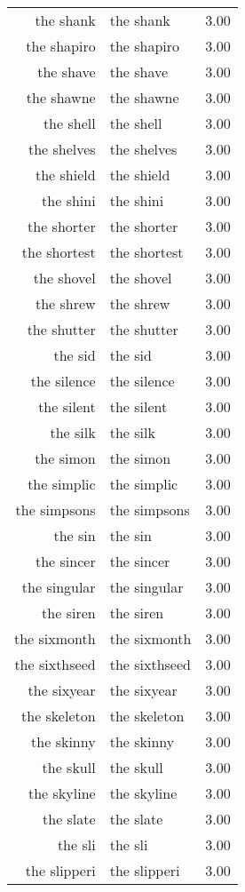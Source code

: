 \begin{table}[ht]
\begin{tabular}{rlr}
  the shank & the shank & 3.00 \\ 
  the shapiro & the shapiro & 3.00 \\ 
  the shave & the shave & 3.00 \\ 
  the shawne & the shawne & 3.00 \\ 
  the shell & the shell & 3.00 \\ 
  the shelves & the shelves & 3.00 \\ 
  the shield & the shield & 3.00 \\ 
  the shini & the shini & 3.00 \\ 
  the shorter & the shorter & 3.00 \\ 
  the shortest & the shortest & 3.00 \\ 
  the shovel & the shovel & 3.00 \\ 
  the shrew & the shrew & 3.00 \\ 
  the shutter & the shutter & 3.00 \\ 
  the sid & the sid & 3.00 \\ 
  the silence & the silence & 3.00 \\ 
  the silent & the silent & 3.00 \\ 
  the silk & the silk & 3.00 \\ 
  the simon & the simon & 3.00 \\ 
  the simplic & the simplic & 3.00 \\ 
  the simpsons & the simpsons & 3.00 \\ 
  the sin & the sin & 3.00 \\ 
  the sincer & the sincer & 3.00 \\ 
  the singular & the singular & 3.00 \\ 
  the siren & the siren & 3.00 \\ 
  the sixmonth & the sixmonth & 3.00 \\ 
  the sixthseed & the sixthseed & 3.00 \\ 
  the sixyear & the sixyear & 3.00 \\ 
  the skeleton & the skeleton & 3.00 \\ 
  the skinny & the skinny & 3.00 \\ 
  the skull & the skull & 3.00 \\ 
  the skyline & the skyline & 3.00 \\ 
  the slate & the slate & 3.00 \\ 
  the sli & the sli & 3.00 \\ 
  the slipperi & the slipperi & 3.00 \\ 

\end{tabular}
\end{table}
